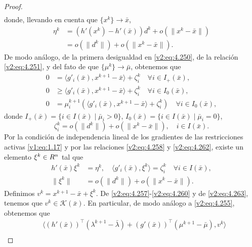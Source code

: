 \begin{proof}
\begin{align}
        \label{v2:eq:4.257}
    \end{align}
    donde, llevando en cuenta que $\{x^k\} \to \bar{x}$,
    \begin{align}
        \eta^k &= (h'(x^k) - h'(\bar{x}))d^k + o(\|x^k - \bar{x}\|) \nonumber \\
        &= o(\|d^k\|) + o(\|x^k - \bar{x}\|).
        \label{v2:eq:4.258}
    \end{align}
    De modo análogo, de la primera desigualdad en \eqref{v2:eq:4.250}, de la relación \eqref{v2:eq:4.251}, y del fato de que $\{\mu^k\} \to \bar{\mu}$, obtenemos que
    \begin{align}
        0 &= \langle g'_i(\bar{x}), x^{k+1} - \bar{x} \rangle + \zeta^k_i \quad \forall i \in I_+(\bar{x}), \label{v2:eq:4.259} \\
        0 &\ge \langle g'_i(\bar{x}), x^{k+1} - \bar{x} \rangle + \zeta^k_i \quad \forall i \in I_0(\bar{x}), \label{v2:eq:4.260} \\
        0 &= \mu_i^{k+1}(\langle g'_i(\bar{x}), x^{k+1} - \bar{x} \rangle + \zeta^k_i) \quad \forall i \in I_0(\bar{x}), \label{v2:eq:4.261}
    \end{align}
    donde $I_+(\bar{x}) = \{i \in I(\bar{x}) \mid \bar{\mu}_i > 0\}$, $I_0(\bar{x}) = \{i \in I(\bar{x}) \mid \bar{\mu}_i = 0\}$,
    \begin{equation}
        \zeta^k_i = o(\|d^k\|) + o(\|x^k - \bar{x}\|), \quad i \in I(\bar{x}).
        \label{v2:eq:4.262}
    \end{equation}
    Por la condición de independencia lineal de los gradientes de las restricciones activas \eqref{v1:eq:1.17} y por las relaciones \eqref{v2:eq:4.258} y \eqref{v2:eq:4.262}, existe un elemento $\xi^k \in R^n$ tal que
    \begin{align}
        h'(\bar{x})\xi^k &= \eta^k, \quad \langle g'_i(\bar{x}), \xi^k \rangle = \zeta^k_i \quad \forall i \in I(\bar{x}), \label{v2:eq:4.263} \\
        \|\xi^k\| &= o(\|d^k\|) + o(\|x^k - \bar{x}\|). \label{v2:eq:4.264}
    \end{align}
    Definimos $v^k = x^{k+1} - \bar{x} + \xi^k$. De \eqref{v2:eq:4.257}-\eqref{v2:eq:4.260} y de \eqref{v2:eq:4.263}, tenemos que $v^k \in \mathcal{K}(\bar{x})$. En particular, de modo análogo a \eqref{v2:eq:4.255}, obtenemos que
    \begin{align*}
        &\langle (h'(\bar{x}))^\top(\lambda^{k+1} - \bar{\lambda}) + (g'(\bar{x}))^\top(\mu^{k+1} - \bar{\mu}), v^k \rangle \\

\end{align*}
\end{proof}
